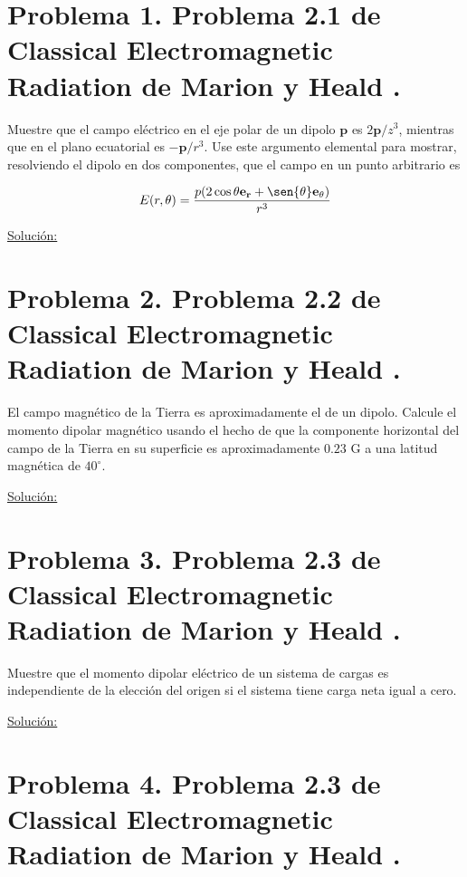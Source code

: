 \documentclass[a4paper,11pt]{article}
\numberwithin{equation}{section}
\begin{document}
\section{Problema 1. Problema 2.1 de Classical Electromagnetic Radiation
de Marion y Heald \cite{marion2}.}

Muestre que el campo eléctrico en el eje polar de un dipolo $\mathbf{p}$ es 
$2\mathbf{p}/z^3$, mientras que en el plano ecuatorial es $-\mathbf{p}/r^3$. Use 
este argumento elemental para mostrar, resolviendo el dipolo en dos componentes, que 
el campo en un punto arbitrario es 

$$
E(r,\theta) = \frac{p(2\cos{\theta}\mathbf{e_r} + \sen{\theta}\mathbf{e_\theta})}{r^3}
$$

\vspace{.3cm}

\underline{Solución:} \vspace{.3cm}

\section{Problema 2. Problema 2.2 de Classical Electromagnetic Radiation
de Marion y Heald \cite{marion2}.}

El campo magnético de la Tierra es aproximadamente el de un dipolo. Calcule el momento 
dipolar magnético usando el hecho de que la componente horizontal del campo de la 
Tierra en su superficie es aproximadamente $0.23$ G a una latitud magnética de 
$40^\circ$.

\vspace{.3cm}

\underline{Solución:} \vspace{.3cm}

\section{Problema 3. Problema 2.3 de Classical Electromagnetic Radiation
de Marion y Heald \cite{marion2}.}

Muestre que el momento dipolar eléctrico de un sistema de cargas es independiente 
de la elección del origen si el sistema tiene carga neta igual a cero.

\vspace{.3cm}

\underline{Solución:} \vspace{.3cm}

\section{Problema 4. Problema 2.3 de Classical Electromagnetic Radiation
de Marion y Heald \cite{marion2}.}
\end{document}
